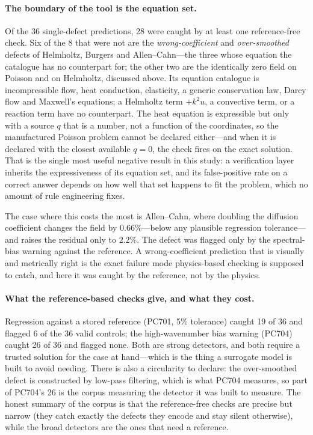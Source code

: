 \documentclass[11pt]{article}
\begin{document}
\paragraph{The boundary of the tool is the equation set.} Of the 36 single-defect predictions, 28
were caught by at least one reference-free check. Six of the 8 that were not are the
\emph{wrong-coefficient} and \emph{over-smoothed} defects of Helmholtz, Burgers and Allen--Cahn---the
three whose equation the catalogue has no counterpart for; the other two are the identically zero field on Poisson
and on Helmholtz, discussed above. Its equation catalogue is incompressible flow, heat
conduction, elasticity, a generic conservation law, Darcy flow and Maxwell's equations; a Helmholtz
term $+k^2u$, a convective term, or a reaction term have no counterpart. The heat equation is
expressible but only with a source $q$ that is a number, not a function of the coordinates, so the
manufactured Poisson problem cannot be declared either---and when it is declared with the closest
available $q=0$, the check fires on the exact solution. That is the single most useful negative
result in this study: a verification layer inherits the expressiveness of its equation set, and its
false-positive rate on a correct answer depends on how well that set happens to fit the problem,
which no amount of rule engineering fixes.

The case where this costs the most is Allen--Cahn, where doubling the diffusion coefficient changes
the field by $0.66\%$---below any plausible regression tolerance---and raises the residual only to
$2.2\%$. The defect was flagged only by the spectral-bias warning against the reference. A
wrong-coefficient prediction that is visually and metrically right is the exact failure mode
physics-based checking is supposed to catch, and here it was caught by the reference, not by the
physics.

\paragraph{What the reference-based checks give, and what they cost.} Regression against a stored
reference (PC701, 5\% tolerance) caught 19 of 36 and flagged 6 of the 36 valid controls; the
high-wavenumber bias warning (PC704) caught 26 of 36 and flagged none. Both are strong detectors, and
both require a trusted solution for the case at hand---which is the thing a surrogate model is built
to avoid needing. There is also a circularity to declare: the over-smoothed defect is constructed by
low-pass filtering, which is what PC704 measures, so part of PC704's 26 is the corpus measuring the
detector it was built to measure. The honest summary of the corpus is that the
reference-free checks are precise but narrow (they catch exactly the defects they encode and stay
silent otherwise), while the broad detectors are the ones that need a reference.
\end{document}
